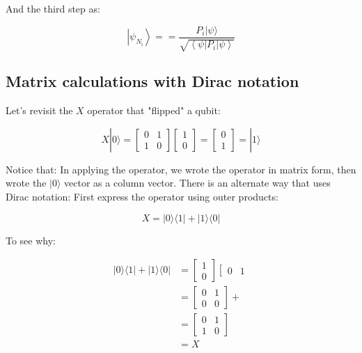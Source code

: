 \documentclass[main.tex]{subfiles}
\begin{document}
    And the third step as:
    
    $$
    \left|\psi_{N_{\mathrm{i}}}\right\rangle==\frac{P_{i}|\psi\rangle}{\sqrt{\left\langle\psi\left|P_{i}\right| \psi\right\rangle}}
    $$

\subsection{Matrix calculations with Dirac notation}

    Let's revisit the $X$ operator that "flipped" a qubit:
    
    $$
    X|0\rangle=\left[\begin{array}{ll}
    0 & 1 \\
    1 & 0
    \end{array}\right]\left[\begin{array}{l}
    1 \\
    0
    \end{array}\right]=\left[\begin{array}{l}
    0 \\
    1
    \end{array}\right]=|1\rangle
    $$
    
    Notice that: In applying the operator, we wrote the operator in matrix form, then wrote the $|0\rangle$ vector as a column vector. There is an alternate way that uses Dirac notation: First express the operator using outer products:
    
    $$
    X=|0\rangle\langle 1|+| 1\rangle\langle 0|
    $$
    
    To see why:
    
    $$
    \begin{aligned}
    |0\rangle\langle 1|+| 1\rangle\langle 0| &=\left[\begin{array}{l}
    1 \\
    0
    \end{array}\right]\left[\begin{array}{ll}
    0 & 1
    \end{array}\right.\\
    &=\left[\begin{array}{ll}
    0 & 1 \\
    0 & 0
    \end{array}\right]+\\
    &=\left[\begin{array}{ll}
    0 & 1 \\
    1 & 0
    \end{array}\right] \\
    &=X
    \end{aligned}
    $$
    
\end{document}
